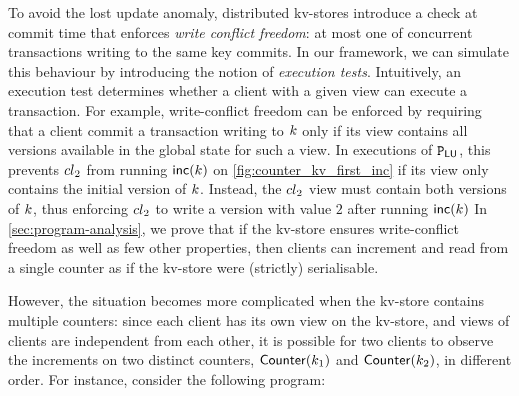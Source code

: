 To avoid the lost update anomaly, distributed kv-stores introduce a check at commit time that enforces 
\emph{write conflict freedom}: at most one of concurrent transactions writing to the same key commits. 
In our framework, we can simulate this behaviour by introducing the notion of \emph{execution tests}. 
Intuitively, an execution test determines whether a client with a given view can execute a transaction. 
For example, write-conflict freedom can be enforced by requiring that a client commit a transaction writing to $k$ 
only if its view contains all versions available in the global state for such a view. 
In executions of $\mathtt{P}_{\mathsf{LU}}$,
this prevents ${cl}_2$ from running $\mathsf{inc}(k)$ on \cref{fig:counter_kv_first_inc}
if its view only contains the initial version of $k$. 
Instead, the ${cl}_2$ view must contain both versions of $k$, 
thus enforcing ${cl}_2$ to write a version with value $2$ after running $\mathsf{inc}(k)$
In \cref{sec:program-analysis}, we prove that if the kv-store 
ensures write-conflict freedom as well as few other properties, then clients can increment 
and read from a single counter as if the kv-store were (strictly) serialisable.

However, the situation becomes more complicated when the kv-store contains multiple counters:  
since each client has its own view on the kv-store, and views of clients are independent from each other, it is possible for two 
clients to observe the increments on two distinct counters, $\mathsf{Counter}(k_1)$ and $\mathsf{Counter}(k_2)$, in different order. 
For instance, consider the following program:

